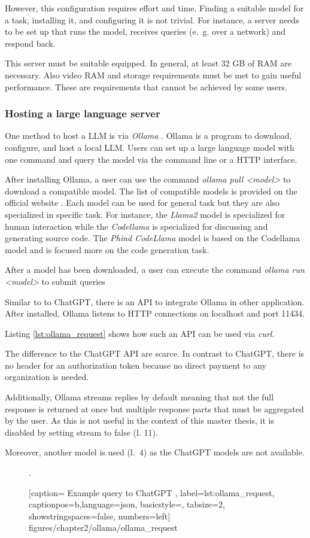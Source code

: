 However, this configuration requires effort and time. Finding a suitable model for a task, installing it, and configuring it is not trivial. For instance, a server needs to be set up that  runs the model, receives queries (e.~g. over a network) and respond back. 

This server must be suitable equipped. In general, at least 32 GB of RAM are necessary. Also video RAM and storage requirements must be met to gain useful performance. These are requirements that cannot be achieved by some users. 

\subsubsection{Hosting a large language server}

One method to host a \ac{LLM} is via \textit{Ollama} \cite{ollama}. Ollama is a program to download, configure, and host a local \ac{LLM}. Users can set up a large language model with one command and query the model via the command line or a \ac{HTTP} interface.

After installing Ollama, a user can use the command \textit{ollama pull <model>} to download a compatible model. The list of compatible models is provided on the official website \cite{ollama}. Each model can be used for general task but they are also specialized in specific task. For instance, the \textit{Llama2} model is specialized for human interaction while the \textit{Codellama} is specialized for discussing and generating source code. The \textit{Phind CodeLlama} model is based on the Codellama model and is focused more on the code generation task. 

After a model has been downloaded, a user can execute the command \textit{ollama run <model>} to submit queries 

Similar to to ChatGPT, there is an \ac{API} to integrate Ollama in other application. After installed, Ollama listens to \ac{HTTP} connections  on localhost and port 11434.

Listing \ref{lst:ollama_request} shows how such an \ac{API} can be used via \textit{curl}.

The difference to the ChatGPT \ac{API} are scarce. In contrast to ChatGPT, there is no header for an authorization token because no direct payment to any organization is needed. 

Additionally, Ollama streams replies by default meaning that not the full response is returned at once but multiple response parts that must be aggregated by the user. As this is not useful in the context of this master thesis, it is disabled by setting stream to false (l. 11).

Moreover, another model is used (l.~4) as the ChatGPT models are not available. 


 \begin{figure} [htbp!]. 
			
			[caption={ Example query to ChatGPT  \cite{ChatGPT_url}},
			label={lst:ollama_request},
			captionpos=b,language=json, basicstyle=\footnotesize, tabsize=2, showstringspaces=false,  numbers=left]
			{figures/chapter2/ollama/ollama_request}
		\end{figure}